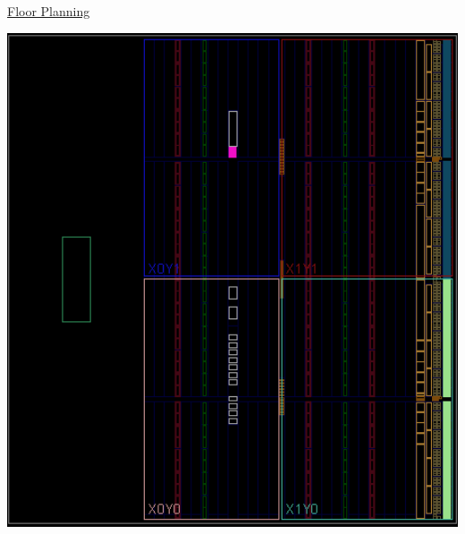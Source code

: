 \documentclass[11pt]{article}
\begin{document}
\begin{center}
    \newpage

    \underline{Floor Planning}

    \includegraphics[width = 1\textwidth]{floorplan.png}


\end{center}
\end{document}

